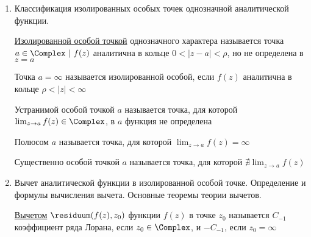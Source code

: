 \begin{enumerate}
    \item Классификация изолированных особых точек однозначной аналитической функции.

    \Def \hyperlink{isolated_special_point}{Изолированной особой точкой} однозначного характера называется точка $a \in \Complex \ | \ f(z)$ аналитична в кольце $0 < |z - a| < \rho$, но не определена в $z = a$

    \Defs Точка $a = \infty$ называется изолированной особой, если $f(z)$ аналитична в кольце $\rho < |z| < \infty$

    \Defs Устранимой особой точкой $a$ называется точка, для которой $\lim_{z \to a} f(z) \in \Complex$, в $a$ функция не определена

    Полюсом $a$ называется точка, для которой $\lim_{z \to a} f(z) = \infty$

    Существенно особой точкой $a$ называется точка, для которой $\nexists \lim_{z \to a} f(z)$

    \item Вычет аналитической функции в изолированной особой точке. Определение и формулы вычисления вычета. Основные теоремы теории вычетов.

    \Defs \hyperlink{residuum}{Вычетом} $\residuum(f(z), z_0)$ функции $f(z)$ в точке $z_0$ называется $C_{-1}$ коэффициент ряда Лорана, если $z_0 \in \Complex$, и $-C_{-1}$, если $z_0 = \infty$


\end{enumerate}